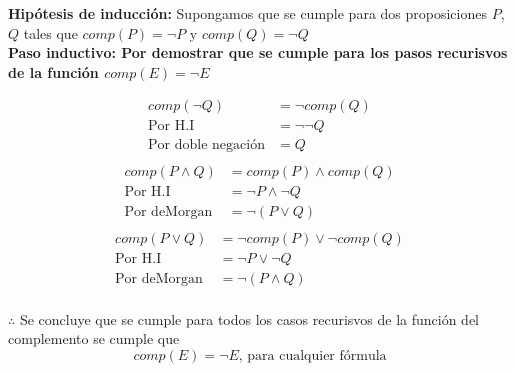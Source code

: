 \textbf{Hipótesis de inducción:} Supongamos que se cumple para dos proposiciones $P$, $Q$ tales que  $comp(P)=\neg P$ y $comp(Q)=\neg Q$\\
\textbf{Paso inductivo: Por demostrar que se cumple para los pasos recurisvos 
de la función $comp(E)=\neg E$}
\begin{multicols}{3}
	\noindent
	\begin{align*}
		comp(\neg Q)              & = \neg comp(Q) \\
		\text{Por H.I}            & = \neg \neg Q  \\
		\text{Por doble negación} & =  Q           \\
	\end{align*}
\noindent
	\begin{align*}
		comp(P\land Q)      & = comp(P)\land comp(Q) \\
		\text{Por H.I}      & = \neg P \land \neg Q  \\
		\text{Por deMorgan} & = \neg (P\lor Q)       \\
	\end{align*}
\noindent
	\begin{align*}
		comp(P\lor Q)       & = \neg comp(P) \lor \neg comp(Q) \\
		\text{Por H.I}      & = \neg P \lor \neg Q             \\
		\text{Por deMorgan} & = \neg (P\land Q)                \\
	\end{align*}
\end{multicols}

$\therefore$ Se concluye que se cumple para todos los casos recurisvos de la función del complemento se cumple que$$comp(E)=\neg E\text{, para cualquier fórmula}$$